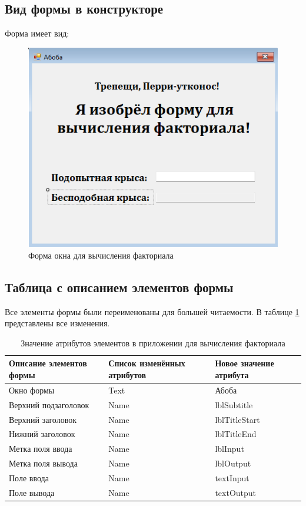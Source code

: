 \subsection{Вид формы в конструкторе}
Форма имеет вид:
\begin{figure}
  \centering
  \includegraphics[width=0.5\linewidth]{images/factorial/form.png}
  \caption{Форма окна для вычисления факториала}
  \label{fig:factorial-form}
\end{figure}

\subsection{Таблица с описанием элементов формы}
Все элементы формы были переименованы для большей читаемости. В таблице \ref{tab:factorial-form} представлены все изменения.

\begin{table}
  \centering
  \begin{tabular}{|m{}|m{}|m{}|}
    \hline
    \textbf{Описание элементов формы} & \textbf{Список изменённых атрибутов} & \textbf{Новое значение атрибута} \\
    \hline
    \hline
    Окно формы & Text & Абоба \\
    Верхний подзаголовок & Name & lblSubtitle \\
    Верхний заголовок & Name & lblTitleStart \\
    Нижний заголовок & Name & lblTitleEnd \\
    Метка поля ввода & Name & lblInput \\
    Метка поля вывода & Name & lblOutput \\
    Поле ввода & Name & textInput \\
    Поле вывода & Name & textOutput \\
    \hline
  \end{tabular}
  \caption{Значение атрибутов элементов в приложении для вычисления факториала}
  \label{tab:factorial-form}
\end{table}

